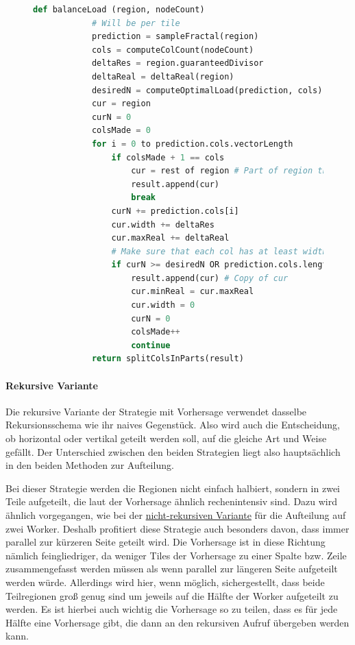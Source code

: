 \begin{figure}[!h]
	\begin{lstlisting}[language=python, caption={Aufteilung in Spalten im Pseudocode}, label={src:prediction_pseudo}]
		def balanceLoad (region, nodeCount)
			# Will be per tile
			prediction = sampleFractal(region)
			cols = computeColCount(nodeCount)
			deltaRes = region.guaranteedDivisor
			deltaReal = deltaReal(region)
			desiredN = computeOptimalLoad(prediction, cols)
			cur = region
			curN = 0
			colsMade = 0
			for i = 0 to prediction.cols.vectorLength
				if colsMade + 1 == cols
					cur = rest of region # Part of region thats not already assigned to a col
					result.append(cur)
					break
				curN += prediction.cols[i]
				cur.width += deltaRes
				cur.maxReal += deltaReal
				# Make sure that each col has at least width = deltaRes
				if curN >= desiredN OR prediction.cols.length - i - 1 < cols
					result.append(cur) # Copy of cur
					cur.minReal = cur.maxReal
					cur.width = 0
					curN = 0
					colsMade++
					continue
			return splitColsInParts(result)
	\end{lstlisting}
\end{figure}

\paragraph*{Rekursive Variante}
Die rekursive Variante der Strategie mit Vorhersage verwendet dasselbe Rekursionsschema wie ihr naives Gegenstück.
Also wird auch die Entscheidung, ob horizontal oder vertikal geteilt werden soll, auf die gleiche Art und Weise gefällt.
Der Unterschied zwischen den beiden Strategien liegt also hauptsächlich in den beiden Methoden zur Aufteilung.

Bei dieser Strategie werden die Regionen nicht einfach halbiert, sondern in zwei Teile aufgeteilt, die laut der Vorhersage ähnlich rechenintensiv sind.
Dazu wird ähnlich vorgegangen, wie bei der \hyperref[lastbalancierung_vorhersage]{nicht-rekursiven Variante} für die Aufteilung auf zwei Worker.
Deshalb profitiert diese Strategie auch besonders davon, dass immer parallel zur kürzeren Seite geteilt wird.
Die Vorhersage ist in diese Richtung nämlich feingliedriger, da weniger Tiles der Vorhersage zu einer Spalte bzw. Zeile zusammengefasst werden müssen als wenn parallel zur längeren Seite aufgeteilt werden würde.
Allerdings wird hier, wenn möglich, sichergestellt, dass beide Teilregionen groß genug sind um jeweils auf die Hälfte der Worker aufgeteilt zu werden.
Es ist hierbei auch wichtig die Vorhersage so zu teilen, dass es für jede Hälfte eine Vorhersage gibt, die dann an den rekursiven Aufruf übergeben werden kann.

